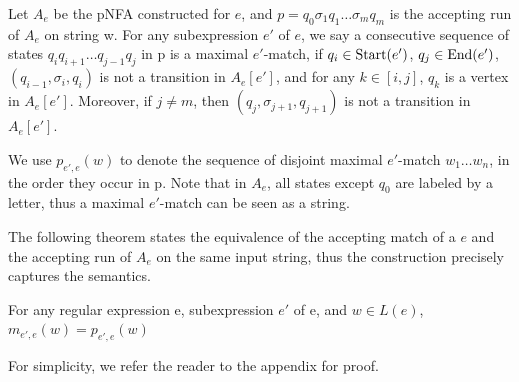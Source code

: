 \begin{definition}
  Let $A_e$ be the pNFA constructed for $e$, and $p = q_0 \sigma_1 q_1 \ldots
  \sigma_m q_m$ is the accepting run of $A_e$ on string w. For any subexpression $e'$ of $e$, we say a
  consecutive sequence of states $q_i q_{i + 1} \ldots q_{j - 1} q_j$ in p is
  a maximal $e'$-match, if $q_i \in \operatorname{Start} (e')$, $q_j \in \operatorname{End}
  (e')$, $(q_{i - 1}, \sigma_i, q_i)$ is not a transition in $A_e [e']$, and
  for any $k \in [i, j]$, $q_k$ is a vertex in $A_e [e']$. Moreover, if $j
  \neq m$, then $(q_j, \sigma_{j + 1}, q_{j + 1})$ is not a transition in $A_e
  [e']$.
  
  We use $p_{e', e} (w)$ to denote the sequence of disjoint maximal $e'$-match
  $w_1 \ldots w_n$, in the order they occur in p. Note that in $A_e$, all
  states except $q_0$ are labeled by a letter, thus a maximal $e'$-match can
  be seen as a string.
\end{definition}

The following  theorem states the equivalence of the accepting match of a \regexp[\sf CG] $e$ and the accepting run of $A_e$ on the same input string, thus the construction precisely captures the semantics. %
\begin{theorem}
 \label{theorem:regex_pnfa_equiv}
  For any regular expression e, subexpression $e'$ of e, and $w \in L (e)$,
  $m_{e', e} (w) = p_{e', e} (w)$
\end{theorem}

For simplicity, we refer the reader to the appendix for proof.

